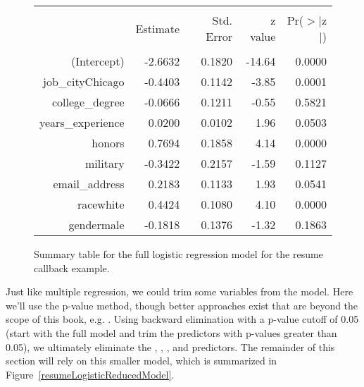 \begin{figure}[ht]
\centering
\begin{tabular}{rrrrr}
  \hline
  \vspace{-3.7mm} & & & & \\
  & Estimate & Std. Error & z value & Pr($>$$|$z$|$) \\
  \hline
  \vspace{-3.8mm} & & & & \\
  (Intercept) & -2.6632 & 0.1820 & -14.64 & 0.0000 \\
  job\_cityChicago & -0.4403 & 0.1142 & -3.85 & 0.0001 \\
  college\_degree & -0.0666 & 0.1211 & -0.55 & 0.5821 \\
  years\_experience & 0.0200 & 0.0102 & 1.96 & 0.0503 \\
  honors & 0.7694 & 0.1858 & 4.14 & 0.0000 \\
  military & -0.3422 & 0.2157 & -1.59 & 0.1127 \\
  email\_address & 0.2183 & 0.1133 & 1.93 & 0.0541 \\
  racewhite & 0.4424 & 0.1080 & 4.10 & 0.0000 \\
  gendermale & -0.1818 & 0.1376 & -1.32 & 0.1863 \\
  \hline
\end{tabular}
\caption{Summary table for the full logistic regression model
    for the resume callback example.}
\label{resumeLogisticModelResults}
\end{figure}
\newcommand{\resRaceWhiteCoef}{0.4424}

Just like multiple regression, we could trim some variables
from the model.
Here we'll use the p-value method, though better approaches
exist that are beyond the scope of this book,
e.g. %
.
Using backward elimination with a p-value cutoff of 0.05
(start with the full model and trim the predictors with
p-values greater than 0.05),
we ultimately eliminate the ,
, , and 
predictors.
The remainder of this section will rely on this smaller
model, which is summarized in
Figure~\ref{resumeLogisticReducedModel}.

